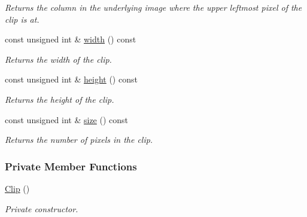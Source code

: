 \begin{CompactItemize}
\begin{CompactList}\small\item\em Returns the column in the underlying image where the upper leftmost pixel of the clip is at. \item\end{CompactList}\item 
const unsigned int \& \hyperlink{class_clip_88d1a47c0ec077e8c6680785509389b0}{width} () const 
\begin{CompactList}\small\item\em Returns the width of the clip. \item\end{CompactList}\item 
const unsigned int \& \hyperlink{class_clip_939908a8dde602d25335792cc0fd5d97}{height} () const 
\begin{CompactList}\small\item\em Returns the height of the clip. \item\end{CompactList}\item 
const unsigned int \& \hyperlink{class_clip_eb6b12a1a0570b529d6a09633b991fcd}{size} () const 
\begin{CompactList}\small\item\em Returns the number of pixels in the clip. \item\end{CompactList}\end{CompactItemize}
\subsubsection*{Private Member Functions}
\begin{CompactItemize}
\item 
\hyperlink{class_clip_313d69fd73a96253cb578d09d20dcbac}{Clip} ()
\begin{CompactList}\small\item\em Private constructor. \item\end{CompactList}\end{CompactItemize}
